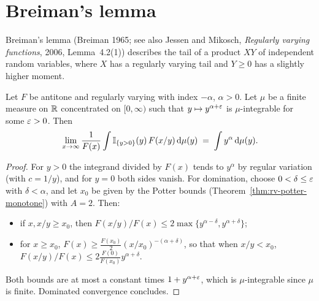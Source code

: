 \chapter{Breiman's lemma}

Breiman's lemma (Breiman 1965; see also Jessen and Mikosch, \emph{Regularly varying
functions}, 2006, Lemma~4.2(1)) describes the tail of a product $X Y$ of independent random
variables, where $X$ has a regularly varying tail and $Y \ge 0$ has a slightly higher moment.

\begin{lemma}
  \label{lem:breiman-analytic}
  \leanok
  Let $F$ be antitone and regularly varying with index $-\alpha$, $\alpha > 0$. Let $\mu$ be a
  finite measure on $\mathbb{R}$ concentrated on $[0, \infty)$ such that $y \mapsto y^{\alpha + \varepsilon}$
  is $\mu$-integrable for some $\varepsilon > 0$. Then
  \begin{align*}
    \lim_{x \to \infty} \frac{1}{F(x)} \int \mathbb{I}_{{\left\{ y > 0 \right\}}}(y) \, F(x / y) \, \mathrm{d} \mu(y)
    \; = \; \int y^\alpha \, \mathrm{d} \mu(y) .
  \end{align*}
\end{lemma}
\begin{proof}
  \leanok
  For $y > 0$ the integrand divided by $F(x)$ tends to $y^\alpha$ by regular variation
  (with $c = 1/y$), and for $y = 0$ both sides vanish. For domination, choose
  $0 < \delta \le \varepsilon$ with $\delta < \alpha$, and let $x_0$ be given by the Potter bounds
  (Theorem~\ref{thm:rv-potter-monotone}) with $A = 2$. Then:
  \begin{itemize}
    \item if $x, x/y \ge x_0$, then
      $F(x/y)/F(x) \le 2 \max\{ y^{\alpha - \delta}, y^{\alpha + \delta} \}$;
    \item for $x \ge x_0$, $F(x) \ge \frac{F(x_0)}{2} (x / x_0)^{-(\alpha+\delta)}$, so that when
      $x / y < x_0$, $F(x/y)/F(x) \le 2 \frac{F(0)}{F(x_0)} y^{\alpha + \delta}$.
  \end{itemize}
  Both bounds are at most a constant times $1 + y^{\alpha + \varepsilon}$, which is $\mu$-integrable
  since $\mu$ is finite. Dominated convergence concludes.
\end{proof}

